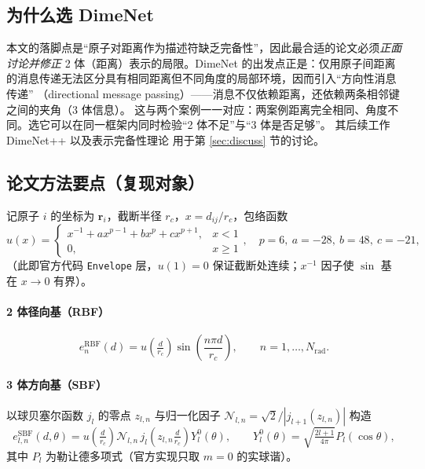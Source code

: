 \documentclass[UTF8,a4paper,11pt]{ctexart}
\begin{document}
\subsection{为什么选 DimeNet}
本文的落脚点是“原子对距离作为描述符缺乏完备性”，因此最合适的论文必须\emph{正面讨论并修正} 2 体（距离）表示的局限。DimeNet\cite{dimenet}
的出发点正是：仅用原子间距离的消息传递无法区分具有相同距离但不同角度的局部环境，因而引入“方向性消息传递”
（directional message passing）——消息不仅依赖距离，还依赖两条相邻键之间的夹角（3 体信息）。
这与两个案例一一对应：两案例距离完全相同、角度不同。选它可以在同一框架内同时检验“2 体不足”与“3 体是否足够”。
其后续工作 DimeNet++\cite{dimenetpp} 以及表示完备性理论\cite{pozd2024,pozd2022} 用于第 \ref{sec:discuss} 节的讨论。

\subsection{论文方法要点（复现对象）}
记原子 $i$ 的坐标为 $\bm r_i$，截断半径 $r_c$，$x=d_{ij}/r_c$，包络函数
\begin{equation}
u(x)=\begin{cases}x^{-1}+a x^{p-1}+b x^{p}+c x^{p+1},& x<1\\ 0,& x\ge 1\end{cases},\quad
p=6,\ a=-28,\ b=48,\ c=-21,
\end{equation}
（此即官方代码 \texttt{Envelope} 层，$u(1)=0$ 保证截断处连续；$x^{-1}$ 因子使 $\sin$ 基在 $x\to0$ 有界）。
\paragraph{2 体径向基（RBF）}
\begin{equation}
e^{\mathrm{RBF}}_{n}(d)=u\!\left(\tfrac{d}{r_c}\right)\sin\!\left(\frac{n\pi d}{r_c}\right),\qquad n=1,\dots,N_{\mathrm{rad}} .
\end{equation}
\paragraph{3 体方向基（SBF）} 以球贝塞尔函数 $j_l$ 的零点 $z_{l,n}$ 与归一化因子 $\mathcal N_{l,n}=\sqrt2/|j_{l+1}(z_{l,n})|$ 构造
\begin{equation}
e^{\mathrm{SBF}}_{l,n}(d,\theta)=u\!\left(\tfrac{d}{r_c}\right)\mathcal N_{l,n}\,j_l\!\left(z_{l,n}\tfrac{d}{r_c}\right)Y_l^0(\theta),
\qquad Y_l^0(\theta)=\sqrt{\tfrac{2l+1}{4\pi}}P_l(\cos\theta),
\end{equation}
其中 $P_l$ 为勒让德多项式（官方实现只取 $m=0$ 的实球谐）。
\end{document}
